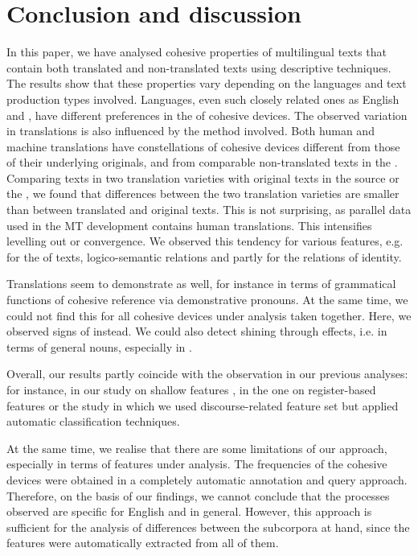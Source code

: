 \documentclass[output=paper]{langsci/langscibook.cls}
\begin{document}


\section{Conclusion and discussion}
In this paper, we have analysed cohesive properties of multilingual texts that contain both translated and non-translated texts using descriptive techniques. The results show that these properties vary depending on the languages and text production types involved. Languages, even such closely related ones as English and , have different preferences in the  of cohesive devices. The observed variation in translations is also influenced by the method involved. Both human and machine translations have constellations of cohesive devices different from those of their underlying originals, and from comparable non-translated texts in the . Comparing texts in two translation varieties with original texts in the source or the , we found that differences between the two translation varieties are smaller than between translated and original texts. This is not surprising, as parallel data used in the MT development contains human translations. This intensifies levelling out or convergence. We observed this tendency for various features, e.g. for the  of texts, logico-semantic relations and partly for the relations of identity.

Translations seem to demonstrate  as well, for instance in terms of grammatical functions of cohesive reference via demonstrative pronouns. At the same time, we could not find this for all cohesive devices under analysis taken together. Here, we observed signs of  instead. We could also detect shining through effects, i.e. in terms of general nouns, especially in .

Overall, our results partly coincide with the observation in our previous analyses: for instance, in our study on shallow features \citep{Lapshinova2015EST}, in the one on register-based features \citep{LapshinovaForthcoming} or the study in which we used discourse-related feature set \citep{Lapshinova2015Disco} but applied automatic classification techniques.

At the same time, we realise that there are some limitations of our approach, especially in terms of features under analysis. The frequencies of the cohesive devices were obtained in a completely automatic annotation and query approach. Therefore, on the basis of our findings, we cannot conclude that the processes observed are specific for English and  in general. However, this approach is sufficient for the analysis of differences between the subcorpora at hand, since the features were automatically extracted from all of them.
\end{document}
